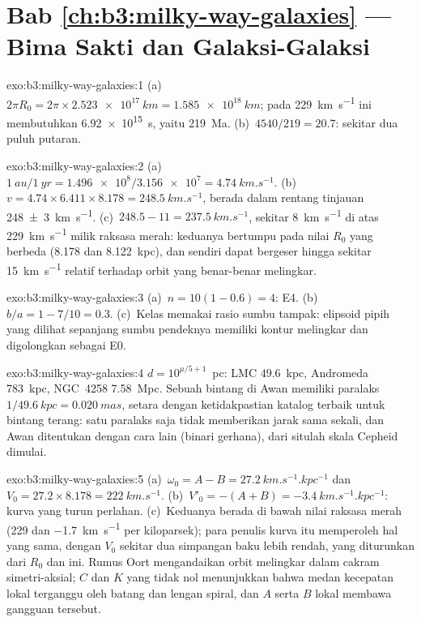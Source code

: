 \section*{Bab \ref{ch:b3:milky-way-galaxies} --- Bima Sakti dan Galaksi-Galaksi}

\begin{solution}{exo:b3:milky-way-galaxies:1}
(a)~$2\pi R_0 = 2\pi\times\qty{2.523e17}{km} = \qty{1.585e18}{km}$; pada
\qty{229}{km.s^{-1}} ini membutuhkan \qty{6.92e15}{s}, yaitu
\qty{219}{Ma}. (b)~$4540/219 = 20.7$: sekitar dua puluh putaran.
\end{solution}

\begin{solution}{exo:b3:milky-way-galaxies:2}
(a)~$\qty{1}{au}/\qty{1}{yr} = \num{1.496e8}/\num{3.156e7} =
\qty{4.74}{km.s^{-1}}$. (b)~$v = 4.74\times6.411\times8.178 =
\qty{248.5}{km.s^{-1}}$, berada dalam rentang tinjauan
\qty[separate-uncertainty=true]{248 \pm 3}{km.s^{-1}}. (c)~$248.5 - 11 = \qty{237.5}{km.s^{-1}}$,
sekitar \qty{8}{km.s^{-1}} di atas \qty{229}{km.s^{-1}} milik raksasa merah:
keduanya bertumpu pada nilai $R_0$ yang berbeda (8.178 dan \qty{8.122}{kpc}),
dan  sendiri dapat bergeser hingga sekitar \qty{15}{km.s^{-1}} relatif
terhadap orbit yang benar-benar melingkar.
\end{solution}

\begin{solution}{exo:b3:milky-way-galaxies:3}
(a)~$n = 10(1 - 0.6) = 4$: E4. (b)~$b/a = 1 - 7/10 = 0.3$. (c)~Kelas
memakai rasio sumbu tampak: elipsoid pipih yang dilihat sepanjang sumbu pendeknya
memiliki kontur melingkar dan digolongkan sebagai E0.
\end{solution}

\begin{solution}{exo:b3:milky-way-galaxies:4}
$d = 10^{\mu/5 + 1}$~pc: LMC \qty{49.6}{kpc}, Andromeda
\qty{783}{kpc}, NGC~4258 \qty{7.58}{Mpc}. Sebuah bintang di Awan memiliki
paralaks $1/\qty{49.6}{kpc} = \qty{0.020}{mas}$, setara dengan
ketidakpastian katalog terbaik untuk bintang terang: satu paralaks saja tidak
memberikan jarak sama sekali, dan Awan ditentukan dengan cara lain
(binari gerhana), dari situlah skala Cepheid dimulai.
\end{solution}

\begin{solution}{exo:b3:milky-way-galaxies:5}
(a)~$\omega_0 = A - B = \qty{27.2}{km.s^{-1}.kpc^{-1}}$ dan $V_0 =
27.2\times8.178 = \qty{222}{km.s^{-1}}$. (b)~$V'_0 = -(A + B) =
\qty{-3.4}{km.s^{-1}.kpc^{-1}}$: kurva yang turun perlahan. (c)~Keduanya
berada di bawah nilai raksasa merah (229 dan \qty{-1.7}{km.s^{-1}} per
kiloparsek); para penulis kurva itu memperoleh hal yang sama, dengan $V_0$ sekitar dua
simpangan baku lebih rendah, yang diturunkan dari $R_0$ dan  ini. Rumus Oort
mengandaikan orbit melingkar dalam cakram simetri-aksial; $C$ dan
$K$ yang tidak nol menunjukkan bahwa medan kecepatan lokal terganggu oleh batang dan
lengan spiral, dan $A$ serta $B$ lokal membawa gangguan tersebut.
\end{solution}

